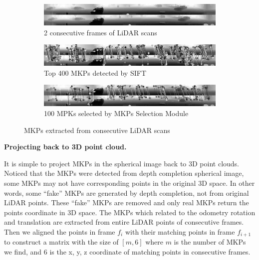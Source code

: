 \documentclass[sigconf]{acmart}
\newcommand{\bfsection}[1]{\vspace*{0.1cm}\noindent\textbf{#1.}}
\begin{document}
\begin{figure}[h]
     \centering
     \begin{subfigure}[b]{0.9\textwidth}
         \centering
         \includegraphics[width=\textwidth]{Figures/MKP a.png}
         \caption{2 consecutive frames of LiDAR scans}
     \end{subfigure}

     \begin{subfigure}[b]{0.9\textwidth}
         \centering
         \includegraphics[width=\textwidth]{Figures/MKP b.png}
         \caption{Top 400 MKPs detected by SIFT}
     \end{subfigure}
     
     \begin{subfigure}[b]{0.9\textwidth}
         \centering
         \includegraphics[width=\textwidth]{Figures/MKP c.png}
         \caption{100 MPKs selected by MKPs Selection Module}
     \end{subfigure}
     
        \caption{MKPs extracted from consecutive LiDAR scans}
        \label{fig:MKPs}
\end{figure}


\bfsection{Projecting back to 3D point cloud}

It is simple to project MKPs in the spherical image back to 3D point clouds. Noticed that the MKPs were detected from depth completion spherical image, some MKPs may not have corresponding points in the original 3D space. In other words, some “fake” MKPs are generated by depth completion, not from original LiDAR points. These “fake” MKPs are removed and only real MKPs return the points coordinate in 3D space. The MKPs which related to the odometry rotation and translation are extracted from entire LiDAR points of consecutive frames. Then we aligned the points in frame $f_i$ with their matching points in frame $f_{i+1}$ to construct a matrix with the size of $[m , 6]$ where $m$ is the number of MKPs we find, and 6 is the x, y, z coordinate of matching points in consecutive frames. 
\end{document}
